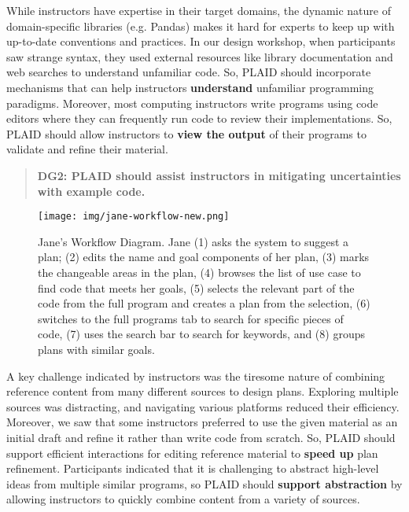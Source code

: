 While instructors have expertise in their target domains, the dynamic nature of domain-specific libraries (e.g. Pandas) makes it hard for experts to keep up with up-to-date conventions and practices.
In our design workshop, when participants saw strange syntax, they used external resources like library documentation and web searches to understand unfamiliar code. 
So, PLAID should incorporate mechanisms that can help instructors \textbf{understand} unfamiliar programming paradigms. 
Moreover, most computing instructors write programs using code editors where they can frequently run code to review their implementations. So, PLAID should allow instructors to \textbf{view the output} of their programs to validate and refine their material.

\begin{quote}
    \textbf{DG2: PLAID should assist instructors in mitigating uncertainties with example code.}
\end{quote}

\begin{figure*}[h]
        \texttt{[image: img/jane-workflow-new.png]}
        \caption{Jane's Workflow Diagram. Jane (1) asks the system to suggest a plan; (2) edits the name and goal components of her plan, (3) marks the changeable areas in the plan, (4) browses the list of use case to find code that meets her goals, (5) selects the relevant part of the code from the full program and creates a plan from the selection, (6) switches to the full programs tab to search for specific pieces of code, (7) uses the search bar to search for keywords, and (8) groups plans with similar goals.}
        \label{fig:jane-workflow}
\end{figure*}

A key challenge indicated by instructors was the tiresome nature of combining reference content from many different sources to design plans. Exploring multiple sources was distracting, and navigating various platforms reduced their efficiency. Moreover, we saw that some instructors preferred to use the given material as an initial draft and refine it rather than write code from scratch. 
So, PLAID should support efficient interactions for editing reference material to \textbf{speed up} plan refinement. Participants indicated that it is challenging to abstract high-level ideas from multiple similar programs, so PLAID should \textbf{support abstraction} by allowing instructors to quickly combine content from a variety of sources.

